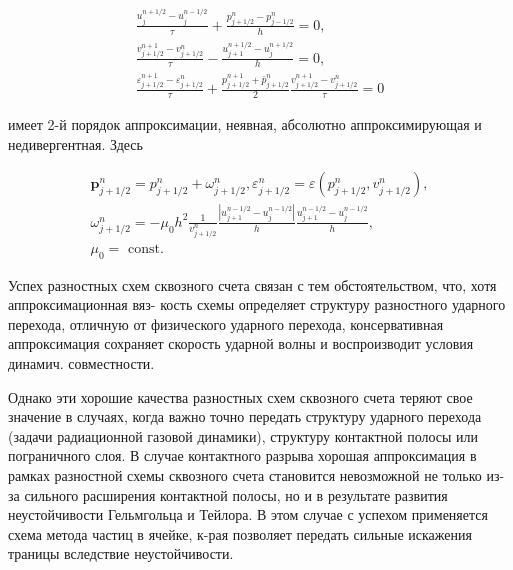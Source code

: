 \documentclass[10pt]{article}
\begin{document}
\[

\begin{gathered}

\frac{u_{j}^{n+1 / 2}-u_{j}^{n-1 / 2}}{\tau}+\frac{p_{j+1 / 2}^{n}-p_{j-1 / 2}^{n}}{h}=0, \\

\frac{v_{j+1 / 2}^{n+1}-v_{j+1 / 2}^{n}}{\tau}-\frac{u_{j+1}^{n+1 / 2}-u_{j}^{n+1 / 2}}{h}=0, \\

\frac{\varepsilon_{j+1 / 2}^{n+1}-\varepsilon_{j+1 / 2}^{n}}{\tau}+\frac{p_{j+1 / 2}^{n+1}+\bar{p}_{j+1 / 2}^{n}}{2} \frac{v_{j+1 / 2}^{n+1}-v_{j+1 / 2}^{n}}{\tau}=0

\end{gathered}

\]



имеет 2-й порядок аппроксимации, неявная, абсолютно аппроксимирующая и недивергентная. Здесь



\[

\begin{gathered}

\boldsymbol{p}_{j+1 / 2}^{n}=p_{j+1 / 2}^{n}+\omega_{j+1 / 2}^{n}, \varepsilon_{j+1 / 2}^{n}=\varepsilon\left(p_{j+1 / 2}^{n}, v_{j+1 / 2}^{n}\right), \\

\omega_{j+1 / 2}^{n}=-\mu_{0} h^{2} \frac{1}{v_{j+1 / 2}^{n}} \frac{\left|u_{j+1}^{n-1 / 2}-u_{j}^{n-1 / 2}\right|}{h} \frac{u_{j+1}^{n-1 / 2}-u_{j}^{n-1 / 2}}{h}, \\

\mu_{0}=\text { const. }

\end{gathered}

\]



Успех разностных схем сквозного счета связан с тем обстоятельством, что, хотя аппроксимационная вяз- кость схемы определяет структуру разностного ударного перехода, отличную от физического ударного перехода, консервативная аппроксимация сохраняет скорость ударной волны и воспроизводит условия динамич. совместности.



Однако эти хорошие качества разностных схем сквозного счета теряют свое значение в случаях, когда важно точно передать структуру ударного перехода (задачи радиационной газовой динамики), структуру контактной полосы или пограничного слоя. В случае контактного разрыва хорошая аппроксимация в рамках разностной схемы сквозного счета становится невозможной не только из-за сильного расширения контактной полосы, но и в результате развития неустойчивости Гельмгольца и Тейлора. В этом случае с успехом применяется схема метода частиц в ячейке, к-рая позволяет передать сильные искажения траницы вследствие неустойчивости.
\end{document}
